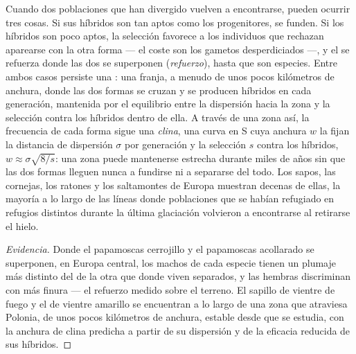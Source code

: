 \begin{proposition}\label{prop:b2:speciation:reinforcement}
Cuando dos poblaciones que han divergido vuelven a encontrarse, pueden
ocurrir tres cosas. Si sus híbridos son tan aptos como los progenitores,
se funden. Si los híbridos son poco aptos, la selección favorece a los
individuos que rechazan aparearse con la otra forma --- el coste son los
gametos desperdiciados ---, y el  se refuerza donde
las dos se superponen (\emph{refuerzo}), hasta que son especies. Entre
ambos casos persiste una
\emph{}: una franja, a menudo de unos pocos kilómetros de
anchura, donde las dos formas se cruzan y se producen híbridos en cada
generación, mantenida por el equilibrio entre la dispersión hacia la zona
y la selección contra los híbridos dentro de ella. A través de una zona
así, la frecuencia de cada forma sigue una \emph{clina}, una curva en S
cuya anchura $w$ la fijan la distancia de dispersión $\sigma$ por
generación y la selección $s$ contra los híbridos, $w \approx
\sigma\sqrt{8/s}$: una zona puede mantenerse estrecha durante miles de
años sin que las dos formas lleguen nunca a fundirse ni a separarse del
todo. Los sapos, las cornejas, los ratones y los saltamontes de Europa
muestran decenas de ellas, la mayoría a lo largo de las líneas donde
poblaciones que se habían refugiado en refugios distintos durante la
última glaciación volvieron a encontrarse al retirarse el hielo.
\end{proposition}
\begin{proof}[Evidencia]
Donde el papamoscas cerrojillo y el papamoscas acollarado se superponen,
en Europa central, los machos de cada especie tienen un plumaje más
distinto del de la otra que donde viven separados, y las hembras
discriminan con más finura --- el refuerzo medido sobre el terreno. El
sapillo de vientre de fuego y el de vientre amarillo se encuentran a lo
largo de una zona que atraviesa Polonia, de unos pocos kilómetros de
anchura, estable desde que se estudia, con la anchura de clina predicha a
partir de su dispersión y de la eficacia reducida de sus híbridos.
\end{proof}

